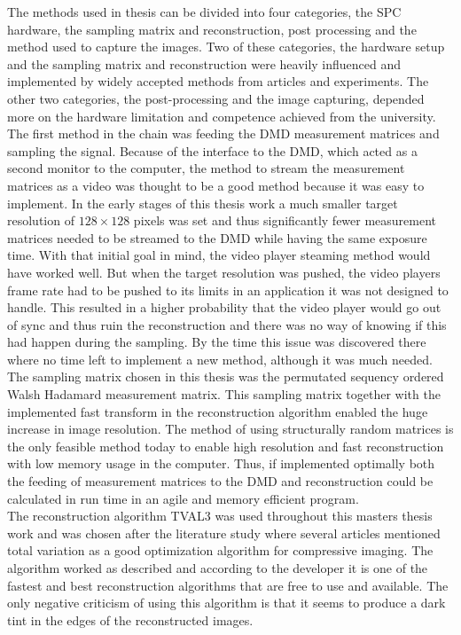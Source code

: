 The methods used in thesis can be divided into four categories, the SPC hardware, the sampling matrix and reconstruction, post processing and the method used to capture the images. Two of these categories, the hardware setup and the sampling matrix and reconstruction were heavily influenced and implemented by widely accepted methods from articles and experiments. The other two categories, the post-processing and the image capturing, depended more on the hardware limitation and competence achieved from the university.\\[0.1in]

The first method in the chain was feeding the DMD measurement matrices and sampling the signal. Because of the interface to the DMD, which acted as a second monitor to the computer, the method to stream the measurement matrices as a video was thought to be a good method because it was easy to implement. In the early stages of this thesis work a much smaller target resolution of $128 \times 128$ pixels was set and thus significantly fewer measurement matrices needed to be streamed to the DMD while having the same exposure time. With that initial goal in mind, the video player steaming method would have worked well. But when the target resolution was pushed, the video players frame rate had to be pushed to its limits in an application it was not designed to handle. This resulted in a higher probability that the video player would go out of sync and thus ruin the reconstruction and there was no way of knowing if this had happen during the sampling. By the time this issue was discovered there where no time left to implement a new method, although it was much needed.\\[0.1in]

The sampling matrix chosen in this thesis was the permutated sequency ordered Walsh Hadamard measurement matrix. This sampling matrix together with the implemented fast transform in the reconstruction algorithm enabled the huge increase in image resolution. The method of using structurally random matrices is the only feasible method today to enable high resolution and fast reconstruction with low memory usage in the computer. Thus, if implemented optimally both the feeding of measurement matrices to the DMD and reconstruction could be calculated in run time in an agile and memory efficient program.\\[0.1in]

The reconstruction algorithm TVAL3 was used throughout this masters thesis work and was chosen after the literature study where several articles mentioned total variation as a good optimization algorithm for compressive imaging. The algorithm worked as described and according to the developer it is one of the fastest and best reconstruction algorithms that are free to use and available. The only negative criticism of using this algorithm is that it seems to produce a dark tint in the edges of the reconstructed images.\\[0.1in]

